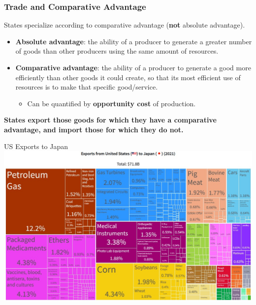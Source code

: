 \documentclass{beamer}
\begin{document}
\begin{frame} 
	\frametitle{\LARGE{Trade and Comparative Advantage}}
	States specialize according to comparative advantage (\textbf{not} absolute advantage). \pause
	\begin{itemize}

			\item \textbf{Absolute advantage}: the ability of a producer to generate a greater number of goods than other producers using the same amount of resources. \pause

			\item \textbf{Comparative advantage}: the ability of a producer to generate a good more efficiently than other goods it could create, so that its most efficient use of resources is to make that specific good/service. \pause 
			\begin{itemize} 
			    \item Can be quantified by \textbf{opportunity cost} of production. \pause
			\end{itemize}
	\end{itemize}
	\textbf{States export those goods for which they have a comparative advantage, and import those for which they do not.}
\end{frame}



\begin{frame}{\LARGE US Exports to Japan}
    \centering
\includegraphics[width=\textwidth,height=0.9\textheight,keepaspectratio]{US to Japan.JPG}
\end{frame}
\end{document}
